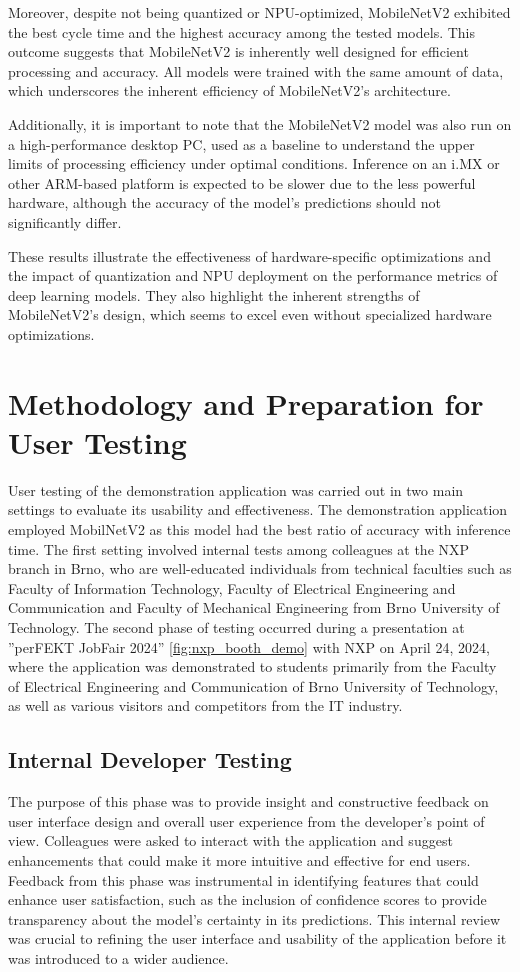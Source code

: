 Moreover, despite not being quantized or NPU-optimized, MobileNetV2 exhibited the best cycle time and the highest accuracy among the tested models. This outcome suggests that MobileNetV2 is inherently well designed for efficient processing and accuracy. All models were trained with the same amount of data, which underscores the inherent efficiency of MobileNetV2's architecture.

Additionally, it is important to note that the MobileNetV2 model was also run on a high-performance desktop PC, used as a baseline to understand the upper limits of processing efficiency under optimal conditions. Inference on an i.MX or other ARM-based platform is expected to be slower due to the less powerful hardware, although the accuracy of the model's predictions should not significantly differ.

These results illustrate the effectiveness of hardware-specific optimizations and the impact of quantization and NPU deployment on the performance metrics of deep learning models. They also highlight the inherent strengths of MobileNetV2's design, which seems to excel even without specialized hardware optimizations.


\section{Methodology and Preparation for User Testing}
User testing of the demonstration application was carried out in two main settings to evaluate its usability and effectiveness. The demonstration application employed MobilNetV2 as this model had the best ratio of accuracy with inference time. The first setting involved internal tests among colleagues at the NXP branch in Brno, who are well-educated individuals from technical faculties such as Faculty of Information Technology, Faculty of Electrical Engineering and Communication and Faculty of Mechanical Engineering from Brno University of Technology. The second phase of testing occurred during a presentation at ''perFEKT JobFair 2024'' \ref{fig:nxp_booth_demo} with NXP on April 24, 2024, where the application was demonstrated to students primarily from the Faculty of Electrical Engineering and Communication of Brno University of Technology, as well as various visitors and competitors from the IT industry.

\subsection{Internal Developer Testing}
The purpose of this phase was to provide insight and constructive feedback on user interface design and overall user experience from the developer's point of view. Colleagues were asked to interact with the application and suggest enhancements that could make it more intuitive and effective for end users. Feedback from this phase was instrumental in identifying features that could enhance user satisfaction, such as the inclusion of confidence scores to provide transparency about the model's certainty in its predictions. This internal review was crucial to refining the user interface and usability of the application before it was introduced to a wider audience.


